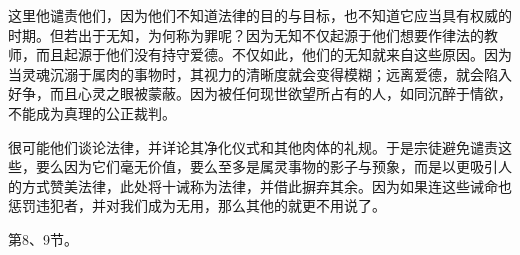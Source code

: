 \par

这里他谴责他们，因为他们不知道法律的目的与目标，也不知道它应当具有权威的时期。但若出于无知，为何称为罪呢？因为无知不仅起源于他们想要作律法的教师，而且起源于他们没有持守爱德。不仅如此，他们的无知就来自这些原因。因为当灵魂沉溺于属肉的事物时，其视力的清晰度就会变得模糊；远离爱德，就会陷入好争，而且心灵之眼被蒙蔽。因为被任何现世欲望所占有的人，如同沉醉于情欲，不能成为真理的公正裁判。\par

\par

很可能他们谈论法律，并详论其净化仪式和其他肉体的礼规。于是宗徒避免谴责这些，要么因为它们毫无价值，要么至多是属灵事物的影子与预象，而是以更吸引人的方式赞美法律，此处将十诫称为法律，并借此摒弃其余。因为如果连这些诫命也惩罚违犯者，并对我们成为无用，那么其他的就更不用说了。\par

第8、9节。\newline{}\par

